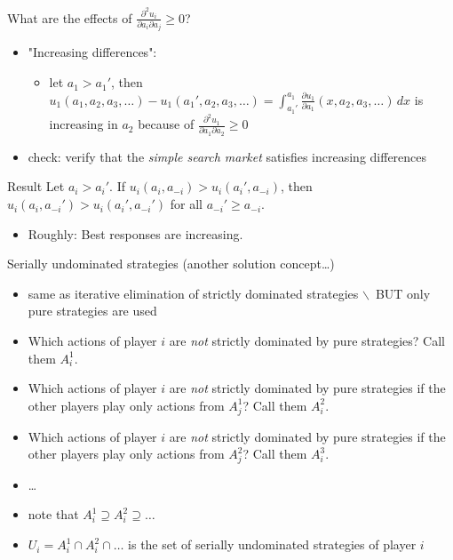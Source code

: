 \documentclass[bigger]{beamer}
\begin{document}
\begin{frame}[label={sec:orgheadline6}]{What are the effects of \(\frac{\partial^2 u_i}{\partial a_i\partial a_j}\geq 0\)?}
\begin{itemize}
\item "Increasing differences":                                         
\begin{itemize}
\item let \(a_1>a_1'\), then \(u_1(a_1,a_2,a_3,\dots)-u_1(a_1',a_2,a_3,\dots)=\int_{a_1'}^{a_1}\frac{\partial u_1}{\partial a_1}(x,a_2,a_3,\dots)\,dx\) is increasing in \(a_2\) because of \(\frac{\partial^2 u_1}{\partial a_1\partial a_2}\geq 0\)
\end{itemize}
\item check: verify that the \emph{simple search market} satisfies increasing differences
\end{itemize}
\begin{block}{Result}
Let \(a_i>a_i'\). If \(u_i(a_i,a_{-i})>u_i(a_i',a_{-i})\), then \(u_i(a_i,a_{-i}')>u_i(a_i',a_{-i}')\) for all \(a_{-i}'\geq a_{-i}\).     
\end{block}
\begin{itemize}
\item Roughly: Best responses are increasing.
\end{itemize}
\end{frame}

\begin{frame}[label={sec:orgheadline7}]{Serially undominated strategies (another solution concept\dots{})}
\begin{itemize}
\item same as iterative elimination of strictly dominated strategies $\backslash$\ BUT only pure strategies are used

\item Which actions of player \(i\) are \emph{not} strictly dominated by pure strategies? Call them \(A_i^1\).
\item Which actions of player \(i\) are \emph{not} strictly dominated by pure strategies if the other players play only actions from \(A_j^1\)? Call them \(A_i^2\).
\item Which actions of player \(i\) are \emph{not} strictly dominated by pure strategies if the other players play only actions from \(A_j^2\)? Call them \(A_i^3\).
\item \dots{}

\item note that \(A_i^1\supseteq A_i^2\supseteq \dots\)
\item \(U_i=A_i^1\cap A_i^2 \cap\dots\) is the set of \alert{serially undominated strategies} of player \(i\)
\end{itemize}
\end{frame}
\end{document}

